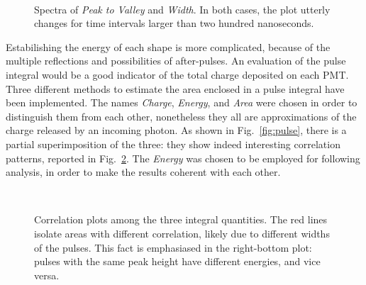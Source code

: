  \begin{figure}
   \centering
   \,
   \caption{Spectra of \emph{Peak to Valley} and \emph{Width}.
 In both cases, the plot utterly changes for time intervals larger than two hundred nanoseconds.} 
   \label{fig:width}
 \end{figure}

 Estabilishing the energy of each shape is more complicated, because of the multiple reflections and possibilities of %
 after-pulses.
 An evaluation of the pulse integral would be a good indicator of the total charge deposited on each PMT.
 Three different methods to estimate the area enclosed in a pulse integral have been implemented.
 The names \emph{Charge}, \emph{Energy}, and \emph{Area} were chosen in order to distinguish them from each other, %
 nonetheless they all are approximations of the charge released by an incoming photon.
 As shown in Fig.~\ref{fig:pulse}, there is a partial superimposition of the three: they show indeed %
 interesting correlation patterns, reported in Fig.~\ref{fig:integral}.
 The \emph{Energy} was chosen to be employed for following analysis, in order to make the results coherent with %
 each other.

\begin{figure}
  \centering
  \,
  \\
  \caption{Correlation plots among the three integral quantities. The red lines isolate areas with different %
  correlation, likely due to different widths of the pulses.
  This fact is emphasiased in the right-bottom plot: pulses with the same peak height have different energies, %
  and vice versa.}
  \label{fig:integral}
\end{figure}


